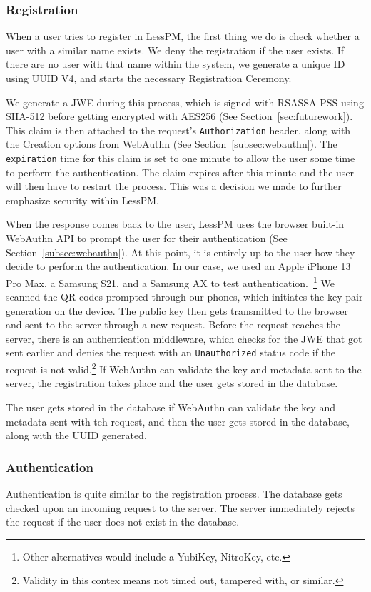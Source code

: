 \subsubsection{Registration}
When a user tries to register in LessPM, the first thing we do is check
whether a user with a similar name exists.
We deny the registration if the user exists.
If there are no user with that name within the system, we generate a unique ID
using UUID V4, and starts the necessary Registration Ceremony.

We generate a JWE during this process, which is signed with RSASSA-PSS
using SHA-512 before getting encrypted with AES256 (See
Section~\ref{sec:futurework}).
This claim is then attached to the request's \texttt{Authorization} header,
along with the Creation options from WebAuthn (See
Section~\ref{subsec:webauthn}).
The \texttt{expiration} time for this claim is set to one minute to allow the
user some time to perform the authentication.
The claim expires after this minute and the user will then have to restart the
process.
This was a decision we made to further emphasize security within LessPM\@.

When the response comes back to the user, LessPM uses the browser built-in
WebAuthn API to prompt the user for their authentication (See
Section~\ref{subsec:webauthn}).
At this point, it is entirely up to the user how they decide to perform the
authentication.
In our case, we used an Apple iPhone 13 Pro Max, a Samsung S21, and a Samsung
AX  to test authentication.~\footnote{
  Other alternatives would include a YubiKey, NitroKey, etc.
}
We scanned the QR codes prompted through our phones, which initiates the
key-pair generation on the device.
The public key then gets transmitted to the browser and sent to the server
through a new request.
Before the request reaches the server, there is an authentication middleware,
which checks for the JWE that got sent earlier and denies the request with an
\texttt{Unauthorized} status code if the request is not valid.\footnote{
  Validity in this contex means not timed out, tampered with, or similar.
}
If WebAuthn can validate the key and metadata sent to the server, the
registration takes place and the user gets stored in the database.

The user gets stored in the database if WebAuthn can validate the key and
metadata sent with teh request, and then the user gets stored in the database,
along with the UUID generated.

\subsubsection{Authentication}
Authentication is quite similar to the registration process.
The database gets checked upon an incoming request to the server.
The server immediately rejects the request if the user does not exist in the
database.

